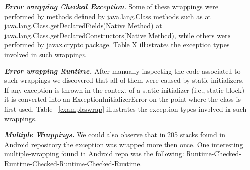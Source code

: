 \documentclass[conference]{IEEEtran}
\begin{document}
\emph{\textbf{Error wrapping Checked Exception.}} Some of these wrappings were performed by methods defined by java.lang.Class methods such as 
at java.lang.Class.getDeclaredFields(Native Method)
at java.lang.Class.getDeclaredConstructors(Native Method), 
while others were performed by javax.crypto package. Table X illustrates
the exception types involved in such wrappings.


\emph{\textbf{Error wrapping Runtime.}} After manually inspecting the code associated to such wrappings 
we discovered that all of them were caused by static initializers. If any exception is thrown in the context of a static initializer (i.e., static block) 
it is converted into an ExceptionInitializerError on the point where the class is first used. Table ~\ref{exampleswrap} illustrates
the exception types involved in such wrappings.



\emph{\textbf{Multiple Wrappings.}} We could also observe that in 205 stacks found
 in Android repository the exception was wrapped  more then once. One interesting 
multiple-wrapping found in Android repo was the 
following: Runtime-Checked-Runtime-Checked-Runtime-Checked-Runtime.
\end{document}
